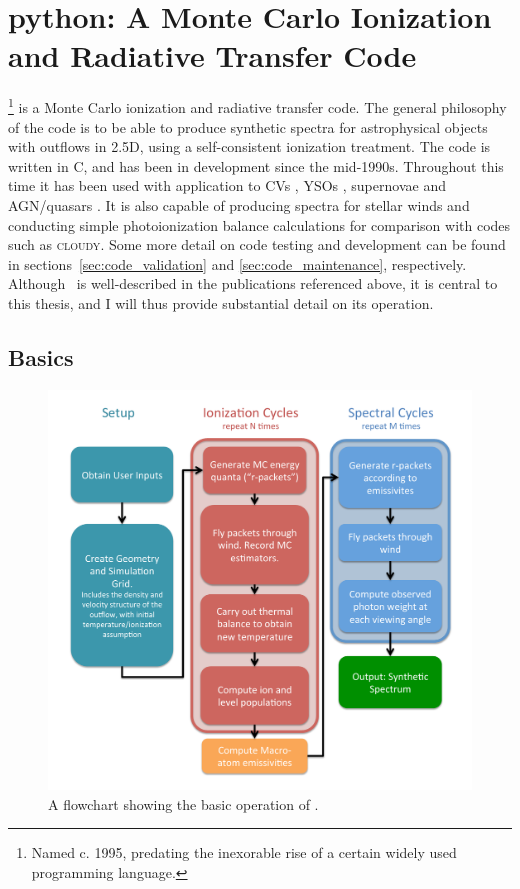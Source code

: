 
\section{{\sc python}: A Monte Carlo Ionization and Radiative Transfer Code}
\label{sec:python}

\py\footnote{Named c. 1995, predating the inexorable rise of a certain widely used
programming language.} is a Monte Carlo ionization and radiative transfer code. 
The general philosophy of the code is to be able to produce synthetic spectra
for astrophysical objects with outflows in 2.5D, using a self-consistent ionization 
treatment. The code is written in C, and has been in development since the mid-1990s.
Throughout this time it has been used with application to CVs \citep[hereafter LK02]{LK02},
YSOs \citep[][hereafter SDL05]{simmacro2005}, supernovae \citep{kerzendorfsim} and AGN/quasars 
\citep[hereafter H13 and H14]{higginbottom2013,H14}. It is also capable of producing spectra 
for stellar winds and conducting simple photoionization balance calculations for
comparison with codes such as \textsc{cloudy}. Some more detail on code testing and 
development can be found in 
sections~\ref{sec:code_validation} and \ref{sec:code_maintenance},
respectively. Although \py\ is well-described in the publications referenced above,
it is central to this thesis, and I will thus provide substantial detail on its operation. 

\subsection{Basics}

\begin{figure}
\centering
\includegraphics[width=1.0\textwidth]{figures/03-radtrans/flowchart.pdf}
\caption
{
A flowchart showing the basic operation of \py.
} 
\label{fig:flowchart}
\end{figure}

